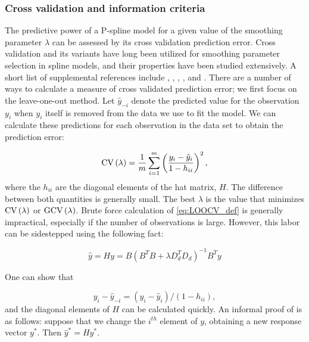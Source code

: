 \documentclass[12pt]{article}
\theoremstyle{definition}
\begin{document}
\subsubsection{Cross validation and information criteria}

The predictive power of a P-spline model for a given value of the smoothing parameter $\lambda$ can be assessed by its cross validation prediction error. Cross validation and its variants have long been utilized for smoothing parameter selection in spline models, and their properties have been studied extensively. A short list of supplemental references include \cite{craven1978smoothing}, \cite{wahba1985comparison}, \cite{hardle1988far}, \cite{hardle1992applied}, and \cite{wahba1990spline}. There are a number of ways to calculate a measure of cross validated prediction error; we first focus on the leave-one-out method. Let $\hat{y}_{-i}$ denote the predicted value for the observation $y_i$ when $y_i$ itself is removed from the data we use to fit the model. We can calculate these predictions for each observation in the data set to obtain the prediction error:

\begin{equation} \label{eq:LOOCV_def}
\textup{CV}\left(\lambda\right) = \frac{1}{m}\sum_{i=1}^m \left( \frac{ y_i - \hat{y}_i }{1-h_{ii}}\right)^2, 
\end{equation}
where the $h_{ii}$ are the diagonal elements of the hat matrix, $H$. The difference between both quantities is generally small. The best $\lambda$ is the value that minimizes $\textup{CV}\left(\lambda\right)$ or $\textup{GCV}\left(\lambda\right) $. Brute force calculation of \ref{eq:LOOCV_def} is generally impractical, especially if the number of observations is large. However, this labor can be sidestepped using the following fact: 

\begin{equation*}
\hat{y} = Hy = B\left(B^TB + \lambda D_d^T D_d \right)^{-1} B^T y
\end{equation*}

One can show that 

\begin{equation} \label{eq:LOO_residual}
y_i - \hat{y}_{-i} = \left(y_i - \hat{y}_{i}\right)/\left(1-h_{ii}\right),
\end{equation}
\noindent
and the diagonal elements of $H$ can be calculated quickly. An informal proof of \label{eq:LOO_residual} is as follows: suppose that we change the $i^{th}$ element of $y$, obtaining a new response vector $y^*$. Then $\hat{y}^* = H y^*$.
\end{document}
